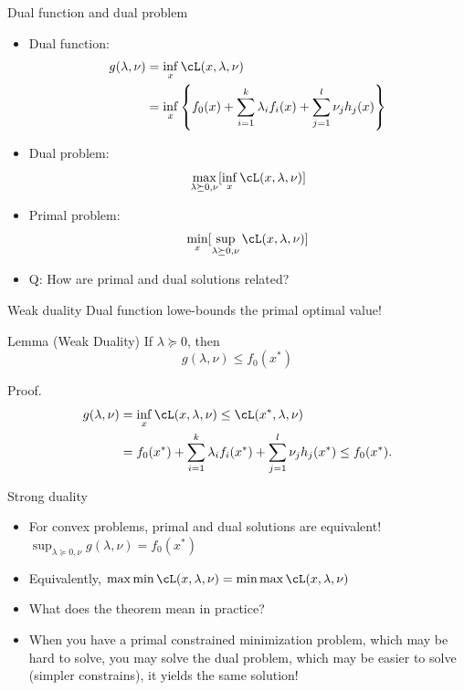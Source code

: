 \documentclass[notes]{beamer}
\begin{document}
\begin{frame}
	{Dual function and dual problem} 
	\begin{itemize}
		\item Dual function: 
		\begin{equation*}
			\begin{aligned}
				g(\lambda , \nu) & = \inf_x \cL (x,\lambda,\nu ) \\ 
				& =\inf_x \left\{ f_0(x)+\sum_{i=1}^{k} \lambda_i f_i(x) + \sum_{j=1}^{l} \nu_j h_j (x) \right\}  \\
			\end{aligned}
		\end{equation*}
		 
		\item Dual problem: \[\max_{\lambda \succeq 0,\nu} [\inf_{x} \cL(x,\lambda, \nu)] \] 
		\item Primal problem: \[\min_x [\sup_{\lambda \succeq 0, \nu} \cL(x,\lambda, \nu)] \] 
		\item Q: How are primal and dual solutions related? 
	\end{itemize}
\end{frame}
\begin{frame}
	{Weak duality} 
	Dual function lowe-bounds the primal optimal value!
	\begin{block}{Lemma (Weak Duality)}
		If $\lambda \succeq 0$, then \[
			g(\lambda, \nu) \le f_0 (x^*)
			\]
	\end{block} 
	\begin{block}{Proof.}
		\begin{equation*}
			\begin{aligned}
				g(\lambda, \nu) & = \inf_x \cL (x,\lambda,\nu) \le \cL (x^*, \lambda, \nu ) \\
				& = f_0(x^*) +\sum_{i=1}^{k} \lambda_i f_i(x^*) + \sum_{j=1}^{l} \nu_j h_j (x^*) \le f_0(x^*). \\ 
			\end{aligned}
		\end{equation*}
	\end{block}
	
\end{frame}

\begin{frame}
	{Strong duality} 
	\begin{itemize}
		\item For convex problems, primal and dual solutions are equivalent! $\sup_{\lambda \succeq 0, \nu } g(\lambda,\nu) =f_0(x^*) $ 
		\item Equivalently, $\max \min \cL (x , \lambda, \nu) =\min \max \cL (x, \lambda, \nu) $ 
		\item What does the theorem mean in practice? 
		
		\item When you have a primal constrained minimization problem, which may be hard to solve, you may solve the dual problem, which may be easier to solve (simpler constrains), it yields the same solution!  
		
	\end{itemize}
\end{frame}
\end{document}
